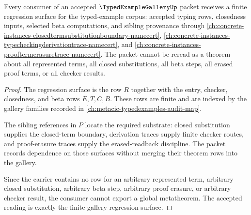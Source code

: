 \begin{theorem}
\label{thm:typed-example-gallery-regression-surface}
Every consumer of an accepted $\TypedExampleGalleryUp$ packet receives a finite regression surface for the typed-example corpus: accepted typing rows, closedness inputs, selected beta computations, and sibling provenance through \autoref{ch:concrete-instances-closedtermsubstitutionboundary-namecert}, \autoref{ch:concrete-instances-typecheckingderivationtrace-namecert}, and \autoref{ch:concrete-instances-prooftermerasuretrace-namecert}. The packet cannot be reread as a theorem about all represented terms, all closed substitutions, all beta steps, all erased proof terms, or all checker results.
\end{theorem}
\begin{proof}
The regression surface is the row $R$ together with the entry, checker, closedness, and beta rows $E,T,C,B$. These rows are finite and are indexed by the gallery families recorded in \autoref{ch:metacic-typedexamples-audit-map}.

The sibling references in $P$ locate the required substrate: closed substitution supplies the closed-term boundary, derivation traces supply finite checker routes, and proof-erasure traces supply the erased-readback discipline. The packet records dependence on those surfaces without merging their theorem rows into the gallery.

Since the carrier contains no row for an arbitrary represented term, arbitrary closed substitution, arbitrary beta step, arbitrary proof erasure, or arbitrary checker result, the consumer cannot export a global metatheorem. The accepted reading is exactly the finite gallery regression surface.
\end{proof}

